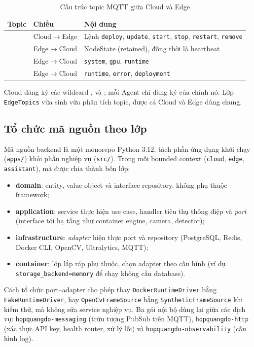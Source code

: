 \begin{table}[H]
\centering
\caption{Cấu trúc topic MQTT giữa Cloud và Edge}
\label{tab:mqtt-topics}
\small
\begin{tabularx}{\textwidth}{L{6.6cm}L{2.5cm}Y}
\toprule
\textbf{Topic} & \textbf{Chiều} & \textbf{Nội dung}\\
\midrule
{} & Cloud$\rightarrow$Edge & Lệnh \texttt{deploy}, \texttt{update}, \texttt{start}, \texttt{stop}, \texttt{restart}, \texttt{remove}\\
 & Edge$\rightarrow$Cloud & NodeState (retained), đồng thời là heartbeat\\
 & Edge$\rightarrow$Cloud & \texttt{system}, \texttt{gpu}, \texttt{runtime}\\
 & Edge$\rightarrow$Cloud & \texttt{runtime}, \texttt{error}, \texttt{deployment}\\
\bottomrule
\end{tabularx}
\end{table}

Cloud đăng ký các wildcard , 
và ; mỗi Agent chỉ đăng ký 
của chính nó. Lớp \texttt{EdgeTopics} vừa sinh vừa phân tích topic, được cả Cloud
và Edge dùng chung.

\subsection{Tổ chức mã nguồn theo lớp}

Mã nguồn backend là một monorepo Python 3.12, tách phần ứng dụng khởi chạy
(\texttt{apps/}) khỏi phần nghiệp vụ (\texttt{src/}). Trong mỗi bounded context
(\texttt{cloud}, \texttt{edge}, \texttt{assistant}), mã được chia thành bốn lớp:

\begin{itemize}
  \item \textbf{domain}: entity, value object và interface repository, không phụ
        thuộc framework;
  \item \textbf{application}: service thực hiện use case, handler tiêu thụ thông
        điệp và \emph{port} (interface tới hạ tầng như container engine, camera,
        detector);
  \item \textbf{infrastructure}: \emph{adapter} hiện thực port và repository
        (PostgreSQL, Redis, Docker CLI, OpenCV, Ultralytics, MQTT);
  \item \textbf{container}: lớp lắp ráp phụ thuộc, chọn adapter theo cấu hình
        (ví dụ \texttt{storage\_backend=memory} để chạy không cần database).
\end{itemize}

Cách tổ chức port--adapter cho phép thay \texttt{DockerRuntimeDriver} bằng
\texttt{FakeRuntimeDriver}, hay \texttt{OpenCvFrameSource} bằng
\texttt{SyntheticFrameSource} khi kiểm thử, mà không sửa service nghiệp vụ.
Ba gói nội bộ dùng lại giữa các dịch vụ: \texttt{hopquangdo-messaging} (trừu
tượng PubSub trên MQTT), \texttt{hopquangdo-http} (xác thực API key, health
router, xử lý lỗi) và \texttt{hopquangdo-observability} (cấu hình log).
